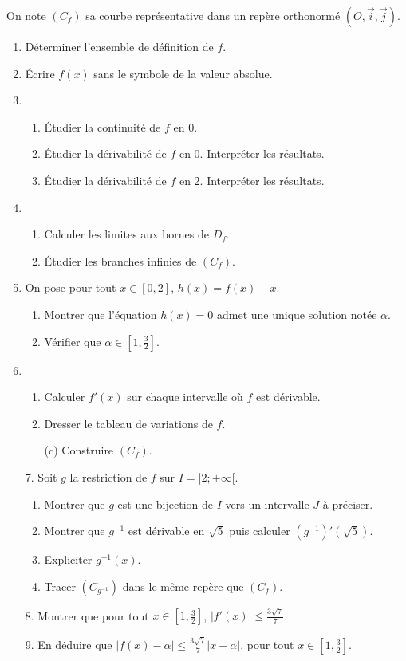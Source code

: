 \documentclass[12pt]{article}
\begin{document}
On note $(C_f)$ sa courbe représentative dans un repère orthonormé $(O, \vec{i}, \vec{j})$.

\begin{enumerate}
    \item Déterminer l’ensemble de définition de $f$.
    \item Écrire $f(x)$ sans le symbole de la valeur absolue.
    \item
    \begin{enumerate}
        \item Étudier la continuité de $f$ en 0.
        \item Étudier la dérivabilité de $f$ en 0. Interpréter les résultats.
        \item Étudier la dérivabilité de $f$ en 2. Interpréter les résultats.
    \end{enumerate}
    \item
    \begin{enumerate}
        \item Calculer les limites aux bornes de $D_f$.
        \item Étudier les branches infinies de $(C_f)$.
    \end{enumerate}
    \item On pose pour tout $x \in [0, 2]$, $h(x) = f(x) - x$.
    \begin{enumerate}
        \item Montrer que l’équation $h(x) = 0$ admet une unique solution notée $\alpha$.
        \item Vérifier que $\alpha \in \left[1, \frac{3}{2}\right]$.
    \end{enumerate}
    \item
    \begin{enumerate}
        \item Calculer $f'(x)$ sur chaque intervalle où $f$ est dérivable.
        \item Dresser le tableau de variations de $f$.
        \item[(c)] Construire $(C_f)$.
    \end{enumerate}
    \item[7.] Soit $g$ la restriction de $f$ sur $I = ]2; +\infty[$.
    \begin{enumerate}
        \item Montrer que $g$ est une bijection de $I$ vers un intervalle $J$ à préciser.
        \item Montrer que $g^{-1}$ est dérivable en $\sqrt{5}$ puis calculer $(g^{-1})'(\sqrt{5})$.
        \item Expliciter $g^{-1}(x)$.
        \item Tracer $(C_{g^{-1}})$ dans le même repère que $(C_f)$.
    \end{enumerate}
    \item[8.] Montrer que pour tout $x \in \left[ 1, \frac{3}{2} \right]$, $|f'(x)| \leq \frac{3\sqrt{7}}{7}$.
    \item[9.] En déduire que $|f(x) - \alpha| \leq \frac{3\sqrt{7}}{7} |x - \alpha|$, pour tout $x \in \left[ 1, \frac{3}{2} \right]$.
\end{enumerate}
\end{document}
